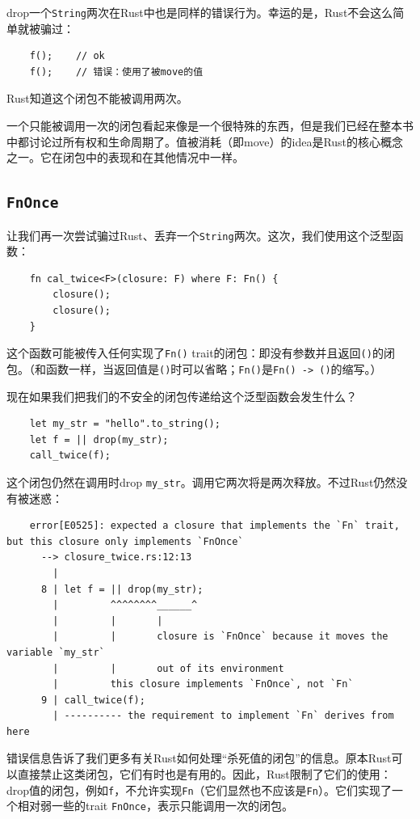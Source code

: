 drop一个\texttt{String}两次在Rust中也是同样的错误行为。幸运的是，Rust不会这么简单就被骗过：
\begin{verbatim}
    f();    // ok
    f();    // 错误：使用了被move的值
\end{verbatim}

Rust知道这个闭包不能被调用两次。

一个只能被调用一次的闭包看起来像是一个很特殊的东西，但是我们已经在整本书中都讨论过所有权和生命周期了。值被消耗（即move）的idea是Rust的核心概念之一。它在闭包中的表现和在其他情况中一样。

\subsection{\texttt{FnOnce}}
让我们再一次尝试骗过Rust、丢弃一个\texttt{String}两次。这次，我们使用这个泛型函数：
\begin{verbatim}
    fn cal_twice<F>(closure: F) where F: Fn() {
        closure();
        closure();
    }
\end{verbatim}

这个函数可能被传入任何实现了\texttt{Fn()} trait的闭包：即没有参数并且返回\texttt{()}的闭包。（和函数一样，当返回值是\texttt{()}时可以省略；\texttt{Fn()}是\texttt{Fn() -> ()}的缩写。）

现在如果我们把我们的不安全的闭包传递给这个泛型函数会发生什么？
\begin{verbatim}
    let my_str = "hello".to_string();
    let f = || drop(my_str);
    call_twice(f);
\end{verbatim}

这个闭包仍然在调用时drop \texttt{my\_str}。调用它两次将是两次释放。不过Rust仍然没有被迷惑：
\begin{verbatim}
    error[E0525]: expected a closure that implements the `Fn` trait, but this closure only implements `FnOnce`
      --> closure_twice.rs:12:13
        |
      8 | let f = || drop(my_str);
        |         ^^^^^^^^______^
        |         |       |
        |         |       closure is `FnOnce` because it moves the variable `my_str`
        |         |       out of its environment
        |         this closure implements `FnOnce`, not `Fn`
      9 | call_twice(f);
        | ---------- the requirement to implement `Fn` derives from here
\end{verbatim}

错误信息告诉了我们更多有关Rust如何处理“杀死值的闭包”的信息。原本Rust可以直接禁止这类闭包，它们有时也是有用的。因此，Rust限制了它们的使用：drop值的闭包，例如\texttt{f}，不允许实现\texttt{Fn}（它们显然也不应该是\texttt{Fn}）。它们实现了一个相对弱一些的trait \texttt{FnOnce}，表示只能调用一次的闭包。

